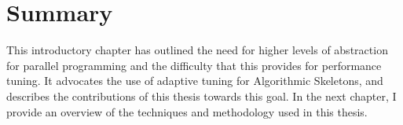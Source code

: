 \section{Summary}

This introductory chapter has outlined the need for higher levels of
abstraction for parallel programming and the difficulty that this
provides for performance tuning. It advocates the use of adaptive
tuning for Algorithmic Skeletons, and describes the contributions of
this thesis towards this goal. In the next chapter, I provide an
overview of the techniques and methodology used in this thesis.
